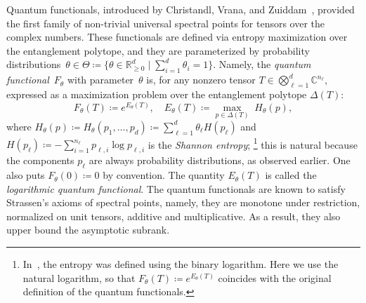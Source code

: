 \documentclass[11pt,letterpaper]{article}
\numberwithin{equation}{section}
\newcommand{\RR}{\mathbb{R}}
\newcommand{\CC}{\mathbb{C}}
\newcommand{\qfunc}{F}
\newcommand{\logqfunc}{E}
\begin{document}
Quantum functionals, introduced by Christandl, Vrana, and Zuiddam~\cite{CVZ2018}, provided the first family of non-trivial universal spectral points for tensors over the complex numbers.
These functionals are defined via entropy maximization over the entanglement polytope, and they are parameterized by probability distributions~$\theta \in \Theta \coloneqq \{ \theta \in \RR^d_{\geq0} \mid \sum_{i=1}^d \theta_i=1\}$.
Namely, the \emph{quantum functional}~$\qfunc_\theta$ with parameter~$\theta$ is, for any nonzero tensor $T\in\bigotimes_{\ell=1}^d \CC^{n_\ell}$, expressed as a maximization problem over the entanglement polytope $\Delta(T)$:
\begin{equation}
\label{eq:intro-def-quantum-functional}
\qfunc_\theta(T) \coloneqq e^{\logqfunc_\theta(T)}, \quad \logqfunc_\theta(T) \coloneqq \max_{p\in\Delta(T)}\; H_\theta(p),
\end{equation}
where $H_\theta(p) \coloneqq H_\theta(p_1,\dots,p_d) \coloneqq \sum_{\ell=1}^d \theta_\ell H(p_\ell)$ and $H(p_\ell) \coloneqq -\sum_{i=1}^{n_\ell} p_{\ell,i} \log p_{\ell,i}$ is the \emph{Shannon entropy};%
\footnote{\label{footnote:qfunc_base}In~\cite{CVZ2018}, the entropy was defined using the binary logarithm. Here we use the natural logarithm, so that $\qfunc_\theta(T) \coloneqq e^{\logqfunc_\theta(T)}$ coincides with the original definition of the quantum functionals.}
this is natural because the components $p_\ell$ are always probability distributions, as observed earlier.
One also puts $F_\theta(0)\coloneqq 0$ by convention.
The quantity $\logqfunc_\theta(T)$ is called the \emph{logarithmic quantum functional}.
The quantum functionals are known to satisfy Strassen's axioms of spectral points, namely, they are monotone under restriction, normalized on unit tensors, additive and multiplicative.
As a result, they also upper bound the asymptotic subrank.
\end{document}
